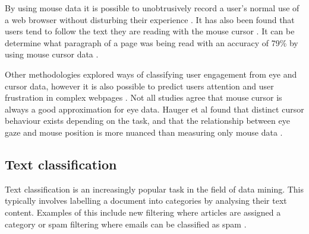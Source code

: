 \documentclass{article}
\begin{document}
By using mouse data it is possible to unobtrusively record a user’s normal use of a web browser without disturbing their experience \cite{goecks2000learning}.
It has also been found that users tend to follow the text they are reading with the mouse cursor \cite{liu2007detecting}. 
It can be determine what paragraph of a page was being read with an accuracy of 79\% by using mouse cursor data \cite{hauger2011using}. 

Other methodologies explored ways of classifying user engagement from eye and cursor data, however it is also possible to predict users attention and user frustration in complex webpages \cite{navalpakkam2012mouse}.
Not all studies agree that mouse cursor is always a good approximation for eye data. 
Hauger et al found that distinct cursor behaviour exists depending on the task, and that the relationship between eye gaze and mouse position is more nuanced than measuring only mouse data \cite{huang2012user}.







\subsection{Text classification}

Text classification is an increasingly popular task in the field of data mining.
This typically involves labelling a document into categories by analysing their text content.
Examples of this include new filtering where articles are assigned a category or spam filtering where emails can be classified as spam \cite{aggarwal2012survey}.
\end{document}
